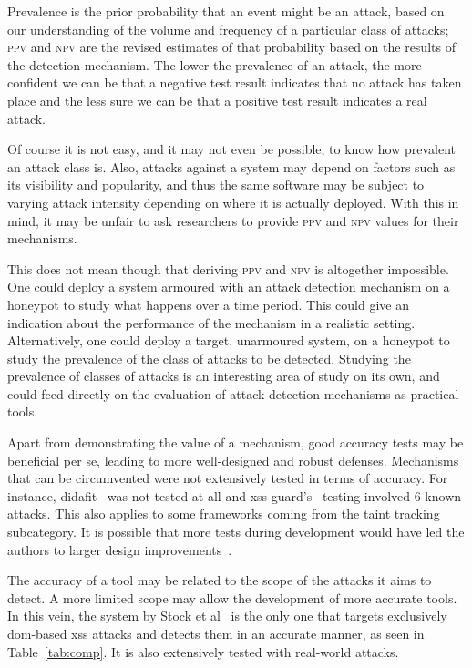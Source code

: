 \documentclass[10pt,journal,compsoc]{IEEEtran}
\begin{document}
\noindent
Prevalence is the prior probability that an event might be an attack,
based on our understanding of the volume and frequency of a particular
class of attacks; 
\textsc{ppv} and \textsc{npv} are the revised estimates of that
probability based on the results of the detection
mechanism. The lower the prevalence of an attack,
the more confident we can be that a negative test result indicates
that no attack has taken place and the less sure we can be that a
positive test result indicates a real attack. 

Of course it is not easy, and it may not even be possible, to know how
prevalent an attack class is. Also, attacks against a system may depend on
factors such as its visibility and popularity, and thus the same
software may be subject to varying attack intensity depending on
where it is actually deployed. With this in mind, it may be unfair to
ask researchers to provide \textsc{ppv} and \textsc{npv} values for
their mechanisms.

This does not mean though that deriving \textsc{ppv} and \textsc{npv} is
altogether impossible. One could deploy a system armoured with an
attack detection mechanism on a honeypot to study what happens over
a time period. This could give an indication about the performance of
the mechanism in a realistic setting. Alternatively, one could deploy a
target, unarmoured system, on a honeypot to study the prevalence of
the class of attacks to be detected. Studying the prevalence of
classes of attacks is an interesting area of study on its own,
and could feed directly on the evaluation of attack detection
mechanisms as practical tools.

Apart from demonstrating the value of a mechanism, good accuracy tests
may be beneficial per se, leading to more well-designed and robust
defenses. Mechanisms that can be circumvented were not extensively
tested in terms of accuracy. For instance, {\sc didafit}~\cite{LLW02}
was not tested at all and {\sc xss-guard}'s~\cite{BV08}
testing involved 6 known attacks.
This also applies to some frameworks coming from the taint tracking
subcategory. It is possible that more tests during development would
have led the authors to larger design improvements~\cite{Van14}.

The accuracy of a tool may be related to the scope of the attacks it
aims to detect. A more limited scope may allow the development of more
accurate tools. In this vein, the system by Stock et al~\cite{SLMS14}
is the only one that targets exclusively {\sc dom}-based {\sc xss}
attacks and detects them in an accurate manner, as seen in
Table~\ref{tab:comp}. It is also extensively tested with real-world
attacks.
\end{document}
